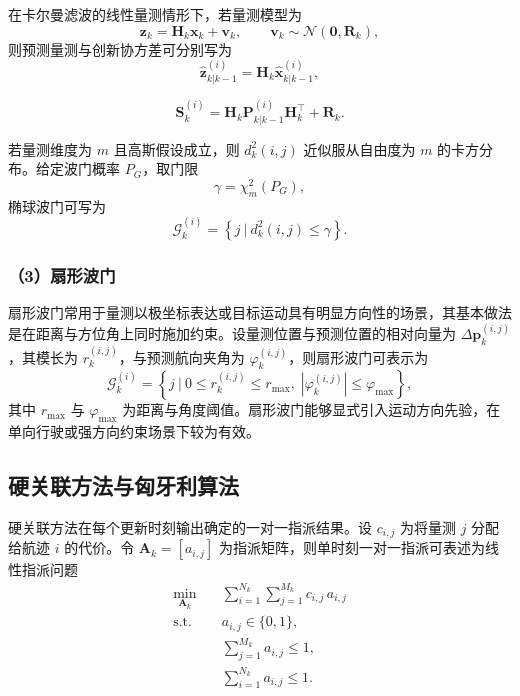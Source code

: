 \documentclass{xdupgthesis}
\begin{document}
在卡尔曼滤波的线性量测情形下，若量测模型为
\begin{equation}
	\mathbf{z}_k=\mathbf{H}_k\mathbf{x}_k+\mathbf{v}_k,\qquad
	\mathbf{v}_k\sim\mathcal{N}(\mathbf{0},\mathbf{R}_k),
\end{equation}
则预测量测与创新协方差可分别写为
\begin{equation}
	\hat{\mathbf{z}}^{(i)}_{k|k-1}
	=
	\mathbf{H}_k
	\hat{\mathbf{x}}^{(i)}_{k|k-1},
\end{equation}

\begin{equation}
	\mathbf{S}^{(i)}_k
	=
	\mathbf{H}_k
	\mathbf{P}^{(i)}_{k|k-1}
	\mathbf{H}_k^\top
	+
	\mathbf{R}_k .
\end{equation}

若量测维度为 $m$ 且高斯假设成立，则 $d_k^2(i,j)$ 近似服从自由度为 $m$ 的卡方分布。给定波门概率 $P_G$，取门限
\[
\gamma=\chi^2_{m}(P_G),
\]
椭球波门可写为
\begin{equation}
	\mathcal{G}^{(i)}_k
	=
	\left\{
	j ~\big|~
	d_k^2(i,j)\le \gamma
	\right\}.
\end{equation}

\subsubsection{（3）扇形波门}

扇形波门常用于量测以极坐标表达或目标运动具有明显方向性的场景，其基本做法是在距离与方位角上同时施加约束。设量测位置与预测位置的相对向量为 $\Delta\mathbf{p}^{(i,j)}_k$，其模长为 $r^{(i,j)}_k$，与预测航向夹角为 $\varphi^{(i,j)}_k$，则扇形波门可表示为
\begin{equation}
	\mathcal{G}^{(i)}_k
	=
	\left\{
	j ~\big|~
	0\le r^{(i,j)}_k\le r_{\max},\;
	|\varphi^{(i,j)}_k|\le \varphi_{\max}
	\right\},
\end{equation}
其中 $r_{\max}$ 与 $\varphi_{\max}$ 为距离与角度阈值。扇形波门能够显式引入运动方向先验，在单向行驶或强方向约束场景下较为有效。

\subsection{硬关联方法与匈牙利算法}

硬关联方法在每个更新时刻输出确定的一对一指派结果。设 $c_{i,j}$ 为将量测 $j$ 分配给航迹 $i$ 的代价。令 $\mathbf{A}_k=[a_{i,j}]$ 为指派矩阵，则单时刻一对一指派可表述为线性指派问题
\begin{align}
	\min_{\mathbf{A}_k}\quad 
	& \sum_{i=1}^{N_k}\sum_{j=1}^{M_k} c_{i,j}\,a_{i,j} \\
	\text{s.t.}\quad
	& a_{i,j}\in\{0,1\}, \\
	& \sum_{j=1}^{M_k} a_{i,j}\le 1, \\
	& \sum_{i=1}^{N_k} a_{i,j}\le 1 .
\end{align}
\end{document}
